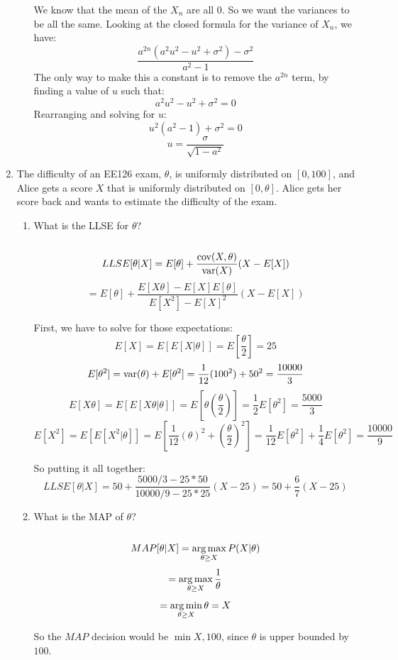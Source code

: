 \begin{enumerate}
\begin{enumerate}
        We know that the mean of the $X_n$ are all $0$. So we want the variances to be all the same. Looking at the closed formula for the variance of $X_n$, we have:
        $$\frac{a^{2n}(a^2u^2 - u^2 + \sigma^2) - \sigma^2}{a^2-1}$$
        The only way to make this a constant is to remove the $a^{2n}$ term, by finding a value of $u$ such that:
        $$a^2u^2 - u^2 + \sigma^2 = 0$$
        Rearranging and solving for $u$:
        $$u^2(a^2 - 1) + \sigma^2 = 0$$
        $$u = \frac{\sigma}{\sqrt{1-a^2}}$$
    \end{enumerate}
  \item The difficulty of an EE126 exam, $\theta$, is uniformly distributed on $[0,100]$, and Alice gets a score $X$ that is uniformly distributed on $[0,\theta]$. Alice gets her score back and wants to estimate the difficulty of the exam.
    \begin{enumerate}
      \item What is the LLSE for $\theta$?\\\\

        $$LLSE[\theta | X] = E[\theta] + \frac{\text{cov}(X,\theta)}{\text{var}(X)}(X - E[X])$$
        $$=E[\theta] + \frac{E[X \theta] - E[X]E[\theta]}{E[X^2] - E[X]^2}(X - E[X])$$

        First, we have to solve for those expectations:
        $$E[X] = E[E[X | \theta]] = E[\frac{\theta}{2}] = 25$$
        $$E[\theta^2] = \text{var}(\theta) + E[\theta^2] = \frac{1}{12}(100^2) + 50^2 = \frac{10000}{3}$$
        $$E[X \theta] = E[E[X \theta | \theta]] = E[\theta(\frac{\theta}{2})] = \frac{1}{2}E[\theta^2] = \frac{5000}{3}$$
        $$E[X^2] = E[E[X^2 | \theta]] = E[\frac{1}{12}(\theta)^2 + (\frac{\theta}{2})^2] = \frac{1}{12}E[\theta^2] + \frac{1}{4}E[\theta^2] = \frac{10000}{9}$$

        So putting it all together:
        $$LLSE[\theta | X] = 50 + \frac{5000/3 - 25*50}{10000/9 - 25*25}(X - 25) = 50 + \frac{6}{7} (X - 25)$$

      \item What is the MAP of $\theta$?\\\\
        
        $$MAP[\theta | X] = \operatorname*{arg\,max}_{\theta \geq X} P(X | \theta)$$
        $$=\operatorname*{arg\,max}_{\theta \geq X} \frac{1}{\theta}$$
        $$=\operatorname*{arg\,min}_{\theta \geq X} \theta = X$$

        So the $MAP$ decision would be $\min{X, 100}$, since $\theta$ is upper bounded by $100$.
        

\end{enumerate}
\end{enumerate}
